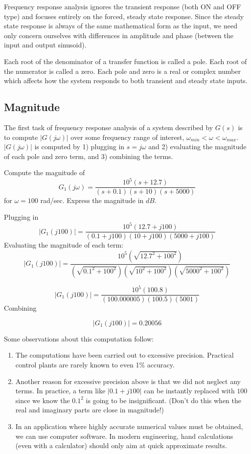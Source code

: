 Frequency response analysis ignores the transient response (both ON and OFF type) and focuses entirely on the forced, steady state response.  Since the steady state response is always of the same mathematical form as the input, we need only concern ourselves with differences in amplitude and phase (between the input and output sinusoid).



Each root of the denominator of a transfer function is called a pole.  Each root of the numerator is called a zero.  Each pole and zero is a real or complex number which affects how the system
responds to both transient and steady state inputs.

\subsection{Magnitude}

The first task of frequency response analysis of a system described by $G(s)$ is to compute $|G(j\omega)|$ over some frequency range of interest, $\omega_{min} < \omega < \omega_{max}$.
$|G(j\omega)|$ is computed by 1) plugging in $s=j\omega$ and 2) evaluating the magnitude of each pole and zero term, and 3) combining the terms.


\begin{ExampleSmall}\label{examplemagnitude}
Compute the magnitude of
\[
G_1(j\omega) = \frac{10^5(s+12.7)}{(s+0.1)(s+10)(s+5000)}
\]
for $\omega = 100$ rad/sec.  Express the magnitude in $dB$.
\vspace{0.25in}

Plugging in
\[
|G_1(j100)| = \frac {10^5(12.7 + j100)}     {(0.1+j100)(10+j100)(5000+j100)}
\]
Evaluating the magnitude of each term:
\[
|G_1(j100)| = \frac {10^5(\sqrt{12.7^2 + 100^2})}     {(\sqrt{0.1^2+100^2})(\sqrt{10^2+100^2})(\sqrt{5000^2+100^2})}
\]

\[
|G_1(j100)| = \frac {10^5(100.8)}     {(100.000005)(100.5)(5001)}
\]
Combining

\[
|G_1(j100)| = 0.20056
\]

Some observations about this computation follow:


\begin{enumerate}
  \item  The computations have been carried out to excessive precision.   Practical control plants are rarely known to even 1\% accuracy.
  \item  Another reason for excessive precision above is that we did not neglect any terms.   In practice, a term like $|0.1+j100|$ can be instantly replaced with $100$ since we know the $0.1^2$ is going to be insignificant.  (Don't do this when the real and imaginary parts are close in magnitude!)
  \item  In an application where highly accurate numerical values must be obtained, we can use computer software.
 In modern engineering, hand calculations (even with a calculator) should only aim at quick approximate results.
\end{enumerate}

\end{ExampleSmall}


